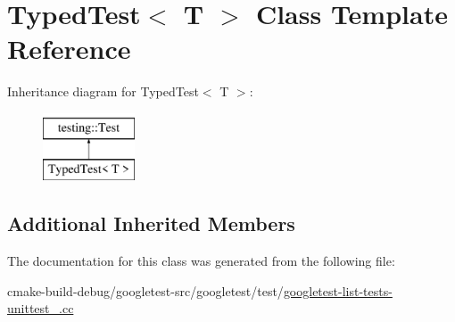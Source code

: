 \hypertarget{classTypedTest}{}\section{Typed\+Test$<$ T $>$ Class Template Reference}
\label{classTypedTest}
Inheritance diagram for Typed\+Test$<$ T $>$\+:\begin{figure}[H]
\begin{center}
\leavevmode
\includegraphics[height=2.000000cm]{classTypedTest}
\end{center}
\end{figure}
\subsection*{Additional Inherited Members}


The documentation for this class was generated from the following file\+:\begin{DoxyCompactItemize}
\item 
cmake-\/build-\/debug/googletest-\/src/googletest/test/\mbox{\hyperlink{googletest-list-tests-unittest___8cc}{googletest-\/list-\/tests-\/unittest\+\_\+.\+cc}}\end{DoxyCompactItemize}
